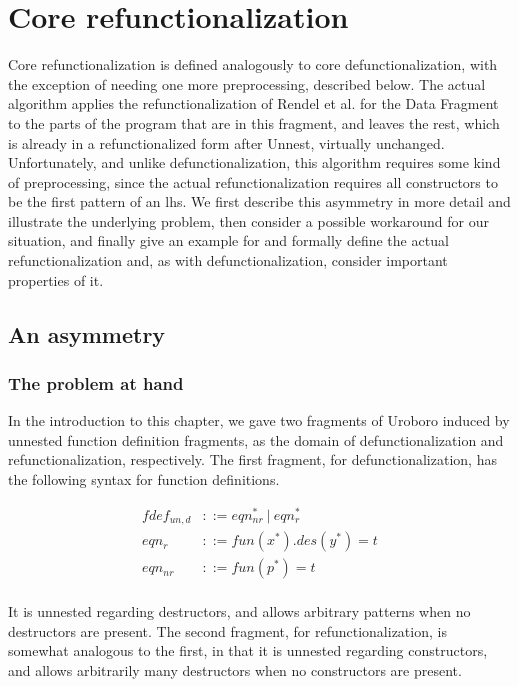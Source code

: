 \section{Core refunctionalization}

Core refunctionalization is defined analogously to core defunctionalization, with the exception of needing one more preprocessing, described below. The actual algorithm applies the refunctionalization of Rendel et al.\cite{rendel15automatic} for the Data Fragment to the parts of the program that are in this fragment, and leaves the rest, which is already in a refunctionalized form after \textsf{Unnest}, virtually unchanged. Unfortunately, and unlike defunctionalization, this algorithm requires some kind of preprocessing, since the actual refunctionalization requires all constructors to be the first pattern of an lhs. We first describe this asymmetry in more detail and illustrate the underlying problem, then consider a possible workaround for our situation, and finally give an example for and formally define the actual refunctionalization and, as with defunctionalization, consider important properties of it.

\subsection{An asymmetry}

\subsubsection{The problem at hand}
\label{sssec:asym}

In the introduction to this chapter, we gave two fragments of Uroboro induced by unnested function definition fragments, as the domain of defunctionalization and refunctionalization, respectively. The first fragment, for defunctionalization, has the following syntax for function definitions.

\begin{align*}
fdef_{un,d} &::= eqn_{nr}^* ~ | ~ eqn_r^* \\
eqn_r &::= fun(x^*).des(y^*) = t \\
eqn_{nr} &::= fun(p^*) = t \\
\end{align*}

It is unnested regarding destructors, and allows arbitrary patterns when no destructors are present. The second fragment, for refunctionalization, is somewhat analogous to the first, in that it is unnested regarding constructors, and allows arbitrarily many destructors when no constructors are present.

